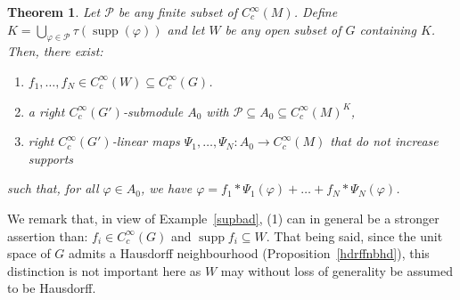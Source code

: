 \documentclass[12pt]{article}
\theoremstyle{plain}
\newtheorem{thm}{Theorem}[section]
\theoremstyle{definition}
\newcommand{\supp}{\operatorname{supp}}
\numberwithin{equation}{section}
\begin{document}
\begin{thm}\label{actionunitality}
Let $\mathscr{P}$ be any finite subset of $C_c^\infty(M)$. Define  $K = \bigcup_{\varphi \in \mathscr{P}} \tau( \operatorname{supp}(\varphi))$ and let $W$ be any open subset of $G$ containing $K$. Then, there exist:
\begin{enumerate}
\item $f_1,\ldots,f_N \in C_c^\infty(W) \subseteq C_c^\infty(G)$.
\item a right $C_c^\infty(G')$-submodule $A_0$ with $\mathscr{P} \subseteq A_0 \subseteq C_c^\infty(M)^K$,
\item right $C_c^\infty(G')$-linear maps $\Psi_1,\ldots,\Psi_N : A_0 \to C_c^\infty(M)$ that do not increase supports
\end{enumerate}
such that, for all $\varphi \in A_0$, we have $\varphi = f_1 * \Psi_1(\varphi) + \ldots + f_N * \Psi_N(\varphi)$.
\end{thm}

We remark that, in view of Example~\ref{supbad}, (1) can in general be a stronger assertion than:  $f_i \in C_c^\infty(G)$ and $\supp f_i \subseteq W$. That being said, since the unit space of $G$ admits a Hausdorff neighbourhood (Proposition~\ref{hdrffnbhd}), this distinction is not important here as $W$ may without loss of generality be assumed to be Hausdorff.
\end{document}
